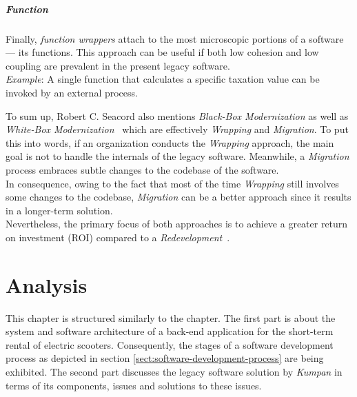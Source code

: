 \documentclass[12pt,a4paper,twoside]{report}
\begin{document}
\paragraph{Function}
Finally, \textit{function wrappers} attach to the most microscopic portions of a software ---
its functions. This approach can be useful if both low cohesion and low coupling are prevalent
in the present legacy software.\\
\textit{Example}: A single function that calculates a specific taxation value
can be invoked by an external process.
\newline

To sum up, Robert C. Seacord also mentions \textit{Black-Box Modernization} as well as
\textit{White-Box Modernization}~\cite{seacord-modernizing-legacy} which are
effectively \textit{Wrapping} and \textit{Migration}. To put this into words,
if an organization conducts the \textit{Wrapping} approach, the main goal is not
to handle the internals of the legacy software.
Meanwhile, a \textit{Migration} process embraces subtle changes to the codebase of the software.\\
In consequence, owing to the fact that most of the time \textit{Wrapping} still
involves some changes to the codebase, \textit{Migration} can be a better
approach since it results in a longer-term solution.\\
Nevertheless, the primary focus of both approaches is to achieve a greater
return on investment (ROI) compared to a \textit{Redevelopment}~\cite{tilley-perspectives-reengineering}.



\chapter{Analysis} \label{chap:analysis}


This chapter is structured similarly to the \textit{}
chapter. The first part is about the system and software architecture of
a back-end application for the short-term rental of electric scooters.
Consequently, the stages of a software development process as depicted
in section \ref{sect:software-development-process} are being exhibited.
The second part discusses the legacy software solution by \textit{Kumpan}
in terms of its components, issues and solutions to these issues.
\end{document}
